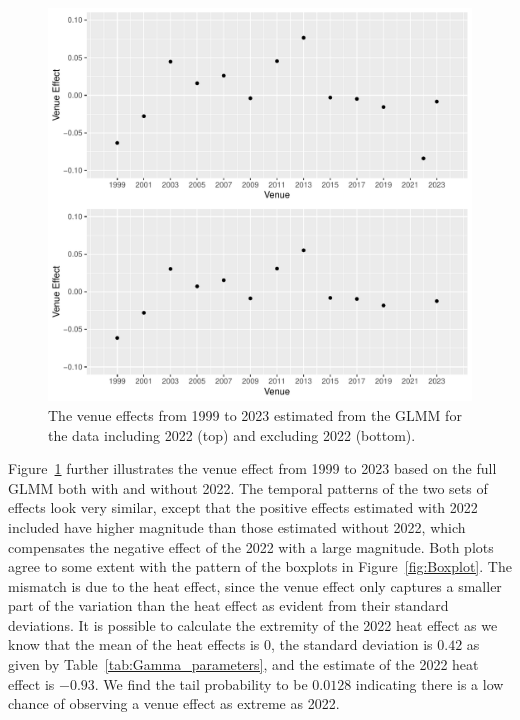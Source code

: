 \documentclass[12pt, letterpaper]{article}
\begin{document}
\begin{figure}[tbp]
  \centering
  \includegraphics{ComparisonOfVenueEffects}
  \caption{The venue effects from 1999 to 2023 estimated from the GLMM for the
    data including 2022 (top) and excluding 2022 (bottom).}
  \label{fig:VenueEffects}
\end{figure}


Figure~\ref{fig:VenueEffects} further illustrates the venue effect from 1999 to
2023 based on the full GLMM both with and without 2022.  The temporal patterns
of the two sets of effects look very similar, except that the positive effects
estimated with 2022 included have higher magnitude than those estimated without
2022, which compensates the negative effect of the 2022 with a large magnitude.
Both plots agree to some extent with the pattern of the boxplots in
Figure~\ref{fig:Boxplot}. The mismatch is due to the heat effect, since the venue
effect only captures a smaller part of the variation than the heat effect as
evident from their standard deviations. It is possible to calculate the extremity
of the 2022 heat effect as we know that the mean of the heat effects is $0$,
the standard deviation is $0.42$ as given by Table~\ref{tab:Gamma_parameters},
and the estimate of the 2022 heat effect is $-0.93$. We find the tail probability
to be $0.0128$ indicating there is a low chance of observing a venue effect as
extreme as 2022.
\end{document}
